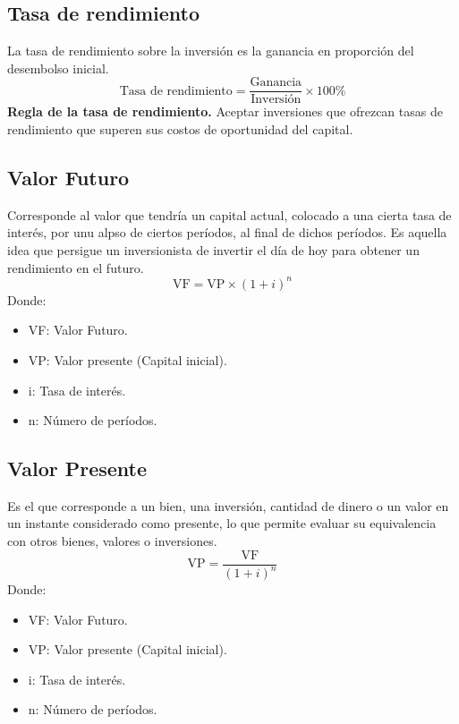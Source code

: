 \documentclass{templateNote}
\begin{document}
\subsection*{Tasa de rendimiento}
La tasa de rendimiento sobre la inversión es la ganancia en proporción del desembolso inicial.
\begin{equation*}
    \text{Tasa de rendimiento} = \frac{\text{Ganancia}}{\text{Inversión}} \times 100\%
\end{equation*}
\textbf{Regla de la tasa de rendimiento.} Aceptar inversiones que ofrezcan tasas de rendimiento que superen sus costos de oportunidad del capital.

\newpage
\subsection*{Valor Futuro}
Corresponde al valor que tendría un capital actual, colocado a una cierta tasa de interés, por unu alpso de ciertos períodos, al final de dichos períodos. Es aquella idea que persigue un inversionista de invertir el día de hoy para obtener un rendimiento en el futuro.
\begin{equation*}
    \text{VF} = \text{VP} \times (1 + i)^n
\end{equation*}
Donde:
\begin{itemize}
    \item VF: Valor Futuro.
    \item VP: Valor presente (Capital inicial).
    \item i: Tasa de interés.
    \item n: Número de períodos.
\end{itemize}

\subsection*{Valor Presente}
Es el que corresponde a un bien, una inversión, cantidad de dinero o un valor
en un instante considerado como presente, lo que permite evaluar su equivalencia con
otros bienes, valores o inversiones.
\begin{equation*}
    \text{VP} = \frac{\text{VF}}{(1 + i)^n}
\end{equation*}
Donde:
\begin{itemize}
    \item VF: Valor Futuro.
    \item VP: Valor presente (Capital inicial).
    \item i: Tasa de interés.
    \item n: Número de períodos.
\end{itemize}
\end{document}

